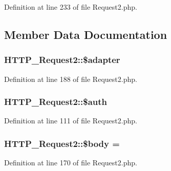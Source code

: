 Definition at line 233 of file Request2.\+php.



\subsection{Member Data Documentation}
\hypertarget{classHTTP__Request2_a4de3f606051b53b314179271f9bd0173}{}
\subsubsection[{\$adapter}]{\setlength{\rightskip}{0pt plus 5cm}H\+T\+T\+P\+\_\+\+Request2\+::\$adapter\hspace{0.3cm}{\ttfamily [protected]}}\label{classHTTP__Request2_a4de3f606051b53b314179271f9bd0173}


Definition at line 188 of file Request2.\+php.

\hypertarget{classHTTP__Request2_a4c1219356a8c669730a1fe09bd8f81b1}{}
\subsubsection[{\$auth}]{\setlength{\rightskip}{0pt plus 5cm}H\+T\+T\+P\+\_\+\+Request2\+::\$auth\hspace{0.3cm}{\ttfamily [protected]}}\label{classHTTP__Request2_a4c1219356a8c669730a1fe09bd8f81b1}


Definition at line 111 of file Request2.\+php.

\hypertarget{classHTTP__Request2_af7de92496442c98589954db8327f9faf}{}
\subsubsection[{\$body}]{\setlength{\rightskip}{0pt plus 5cm}H\+T\+T\+P\+\_\+\+Request2\+::\$body = \textquotesingle{}\textquotesingle{}\hspace{0.3cm}{\ttfamily [protected]}}\label{classHTTP__Request2_af7de92496442c98589954db8327f9faf}


Definition at line 170 of file Request2.\+php.

